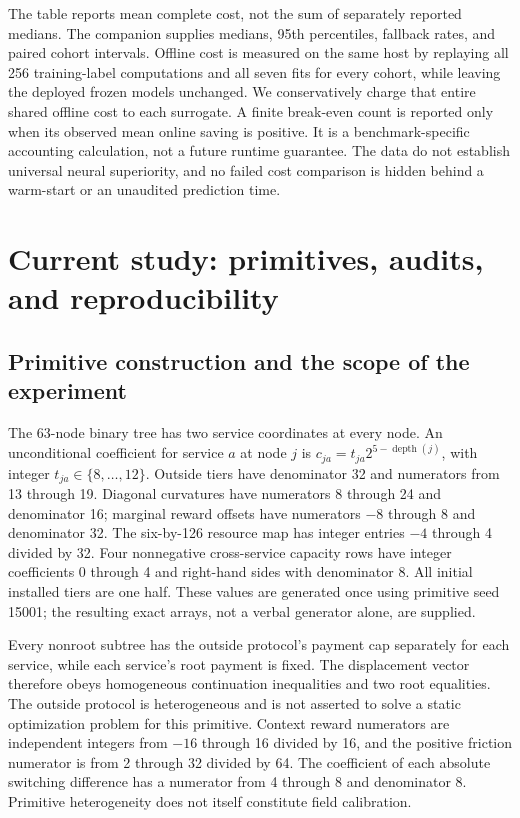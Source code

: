 \documentclass[11pt,letterpaper]{article}
\theoremstyle{definition}
\newcommand{\1}{\mathbf 1}
\begin{document}

The table reports mean complete cost, not the sum of separately reported medians. The companion supplies medians, 95th percentiles, fallback rates, and paired cohort intervals. Offline cost is measured on the same host by replaying all 256 training-label computations and all seven fits for every cohort, while leaving the deployed frozen models unchanged. We conservatively charge that entire shared offline cost to each surrogate. A finite break-even count is reported only when its observed mean online saving is positive. It is a benchmark-specific accounting calculation, not a future runtime guarantee. The data do not establish universal neural superiority, and no failed cost comparison is hidden behind a warm-start or an unaudited prediction time.

\section{Current study: primitives, audits, and reproducibility}\label{ec:r19-details}
\subsection{Primitive construction and the scope of the experiment}
The 63-node binary tree has two service coordinates at every node. An unconditional coefficient for service $a$ at node $j$ is $c_{ja}=t_{ja}2^{5-\operatorname{depth}(j)}$, with integer $t_{ja}\in\{8,\ldots,12\}$. Outside tiers have denominator 32 and numerators from 13 through 19. Diagonal curvatures have numerators 8 through 24 and denominator 16; marginal reward offsets have numerators $-8$ through 8 and denominator 32. The six-by-126 resource map has integer entries $-4$ through 4 divided by 32. Four nonnegative cross-service capacity rows have integer coefficients 0 through 4 and right-hand sides with denominator 8. All initial installed tiers are one half. These values are generated once using primitive seed 15001; the resulting exact arrays, not a verbal generator alone, are supplied.

Every nonroot subtree has the outside protocol's payment cap separately for each service, while each service's root payment is fixed. The displacement vector therefore obeys homogeneous continuation inequalities and two root equalities. The outside protocol is heterogeneous and is not asserted to solve a static optimization problem for this primitive. Context reward numerators are independent integers from $-16$ through 16 divided by 16, and the positive friction numerator is from 2 through 32 divided by 64. The coefficient of each absolute switching difference has a numerator from 4 through 8 and denominator 8. Primitive heterogeneity does not itself constitute field calibration.
\end{document}
